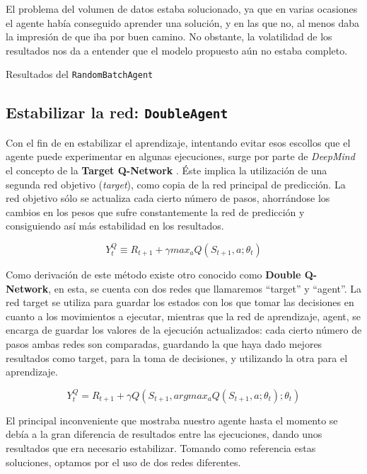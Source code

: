 El problema del volumen de datos estaba solucionado, ya que en varias ocasiones el agente había conseguido aprender una solución, y en las que no, al menos daba la impresión de que iba por buen camino. No obstante, la volatilidad de los resultados nos da a entender que el modelo propuesto aún no estaba completo.

%
       {Resultados del \texttt{RandomBatchAgent}}


\subsection{Estabilizar la red: \texttt{DoubleAgent}}
\label{sec:DA}

Con el fin de en estabilizar el aprendizaje, intentando evitar esos escollos que el agente puede experimentar en algunas ejecuciones, surge por parte de \textit{DeepMind} el concepto de la \textbf{Target Q-Network} \citep{NIPS2010_3964}. Éste implica la utilización de una segunda red objetivo (\textit{target}), como copia de la red principal de predicción. La red objetivo sólo se actualiza cada cierto número de pasos, ahorrándose los cambios en los pesos que sufre constantemente la red de predicción y consiguiendo así más estabilidad en los resultados.

$$Y^Q_{t} \equiv R_{t+1} + \gamma max_{a} Q(S_{t+1}, a; \theta_{t})$$

Como derivación de este método existe otro conocido como \textbf{Double Q-Network}, en esta, se cuenta con dos redes que llamaremos “target” y “agent”. La red target se utiliza para guardar los estados con los que tomar las decisiones en cuanto a los movimientos a ejecutar, mientras que la red de aprendizaje, agent, se encarga de guardar los valores de la ejecución actualizados: cada cierto número de pasos ambas redes son comparadas, guardando la que haya dado mejores resultados como target, para la toma de decisiones, y utilizando la otra para el aprendizaje.

$$Y^Q_{t} = R_{t+1} + \gamma Q(S_{t+1}, argmax_{a} Q(S_{t+1}, a; \theta_{t}); \theta_{t})$$

El principal inconveniente que mostraba nuestro agente hasta el momento se debía a la gran diferencia de resultados entre las ejecuciones, dando unos resultados que era necesario estabilizar. Tomando como referencia estas soluciones, optamos por el uso de dos redes diferentes.


